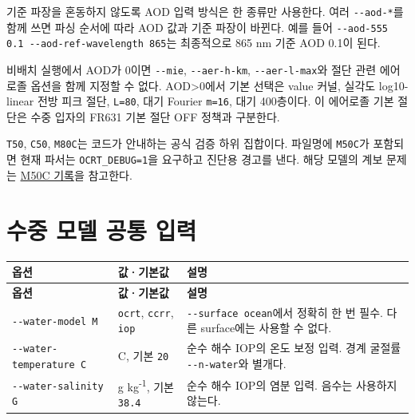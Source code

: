 기준 파장을 혼동하지 않도록 AOD 입력 방식은 한 종류만 사용한다. 여러 \texttt{-\allowbreak{}-\allowbreak{}aod-\allowbreak{}*}를 함께 쓰면 파싱 순서에 따라 AOD 값과 기준 파장이 바뀐다. 예를 들어 \texttt{-\allowbreak{}-\allowbreak{}aod-\allowbreak{}555 0.\allowbreak{}1 -\allowbreak{}-\allowbreak{}aod-\allowbreak{}ref-\allowbreak{}wavelength 865}는 최종적으로 865 nm 기준 AOD 0.1이 된다.

비배치 실행에서 AOD가 0이면 \texttt{-\allowbreak{}-\allowbreak{}mie}, \texttt{-\allowbreak{}-\allowbreak{}aer-\allowbreak{}h-\allowbreak{}km}, \texttt{-\allowbreak{}-\allowbreak{}aer-\allowbreak{}l-\allowbreak{}max}와 절단 관련 에어로졸 옵션을 함께 지정할 수 없다. AOD>0에서 기본 선택은 value 커널, 실각도 log10-linear 전방 피크 절단, \texttt{L=\allowbreak{}80}, 대기 Fourier \texttt{m=\allowbreak{}16}, 대기 400층이다. 이 에어로졸 기본 절단은 수중 입자의 FR631 기본 절단 OFF 정책과 구분한다.

\texttt{T50}, \texttt{C50}, \texttt{M80C}는 코드가 안내하는 공식 검증 하위 집합이다. 파일명에 \texttt{M50C}가 포함되면 현재 파서는 \texttt{OCRT\_\allowbreak{}DEBUG=\allowbreak{}1}을 요구하고 진단용 경고를 낸다. 해당 모델의 계보 문제는 \href{https://github.com/brtnt/OCRT/blob/54861c68e35ec5aaa3938fad53e93dc2dfa7eb1d/code/OCRT_C/inputs/deprecated/DEPRECATED_M50C.md}{M50C 기록}을 참고한다.

\section{수중 모델 공통 입력}
\label{sec:auto:03_options:5}



{\TableFont
\begin{longtable}{@{}>{\raggedright\arraybackslash}p{}>{\raggedright\arraybackslash}p{}>{\raggedright\arraybackslash}p{}@{}}
\toprule
\textbf{옵션} & \textbf{값·기본값} & \textbf{설명} \\
\midrule
\endfirsthead
\toprule
\textbf{옵션} & \textbf{값·기본값} & \textbf{설명} \\
\midrule
\endhead
\bottomrule
\endfoot
\texttt{-\allowbreak{}-\allowbreak{}water-\allowbreak{}model M} & \texttt{ocrt}, \texttt{ccrr}, \texttt{iop} & \texttt{-\allowbreak{}-\allowbreak{}surface ocean}에서 정확히 한 번 필수. 다른 surface에는 사용할 수 없다. \\
\texttt{-\allowbreak{}-\allowbreak{}water-\allowbreak{}temperature C} & \textdegree{}C, 기본 \texttt{20} & 순수 해수 IOP의 온도 보정 입력. 경계 굴절률 \texttt{-\allowbreak{}-\allowbreak{}n-\allowbreak{}water}와 별개다. \\
\texttt{-\allowbreak{}-\allowbreak{}water-\allowbreak{}salinity G} & g kg\textsuperscript{-}\textsuperscript{1}, 기본 \texttt{38.\allowbreak{}4} & 순수 해수 IOP의 염분 입력. 음수는 사용하지 않는다. \\
\end{longtable}
}

